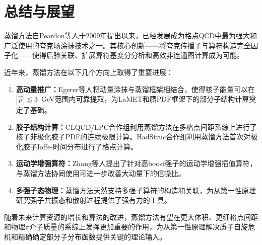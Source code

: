 \documentclass[12pt,a4paper]{ctexart}
\theoremstyle{definition}
\begin{document}
\section{总结与展望}

蒸馏方法自Peardon等人\cite{Peardon2009}于2009年提出以来，已经发展成为格点QCD中最为强大和广泛使用的夸克场涂抹技术之一。其核心创新——将夸克传播子与算符构造完全因子化——使得后验关联、扩展算符基变分分析和高效非连通图计算成为可能。

近年来，蒸馏方法在以下几个方向上取得了重要进展：

\begin{enumerate}
    \item \textbf{高动量推广：}Egerer等人\cite{Egerer2021a}将动量涂抹与蒸馏框架相结合，使得核子能量可以在$|\vec{p}| \lesssim 3$~GeV范围内可靠提取，为LaMET和赝PDF框架下的部分子结构计算奠定了基础。

    \item \textbf{胶子结构计算：}CLQCD/LPC合作组\cite{Chen2025gluon}利用蒸馏方法在多格点间距系综上进行了核子非极化胶子PDF的连续极限计算。HadStruc合作组\cite{Egerer2022}利用蒸馏方法首次对极化胶子Ioffe-时间分布进行了格点计算。

    \item \textbf{运动学增强算符：}Zhang等人\cite{Zhang2025kinematic}提出了针对高boost强子的运动学增强插值算符，与蒸馏方法协同使用可进一步改善大动量下的信噪比。

    \item \textbf{多强子态物理：}蒸馏方法天然支持多强子算符的构造和关联，为从第一性原理研究强子共振态和散射过程提供了强有力的工具\cite{Peardon2009}。
\end{enumerate}

随着未来计算资源的增长和算法的改进，蒸馏方法有望在更大体积、更细格点间距和物理$\pi$介子质量的系综上发挥更加重要的作用，为从第一性原理解决质子自旋危机和精确确定部分子分布函数提供关键的理论输入。
\end{document}
